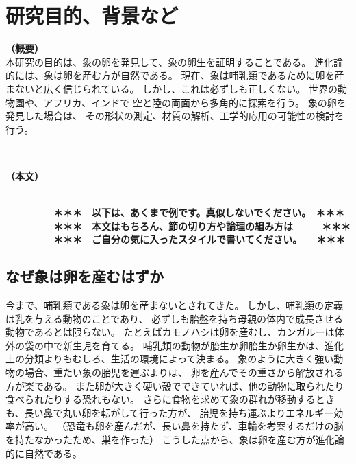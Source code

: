 \documentclass[11pt,a4j,dvipdfmx]{jarticle} 					%
\newcommand{\研究課題名}{象の卵}
\newcommand{\研究機関名}{逢坂大学}
\newcommand{\研究代表者氏名}{湯川秀樹}
\newcommand{\研究期間の最終元号年度}{8}  %
\begin{document}

\section{研究目的、背景など}

\noindent
\mbox{\textbf{（概要）}}\\
本研究の目的は、象の卵を発見して、象の卵生を証明することである。
進化論的には、象は卵を産む方が自然である。
	現在、象は哺乳類であるために卵を産まないと広く信じられている。
	しかし、これは必ずしも正しくない。
	世界の動物園や、アフリカ、インドで
	空と陸の両面から多角的に探索を行う。
	象の卵を発見した場合は、
	その形状の測定、材質の解析、工学的応用の可能性の検討を行う。

\noindent
\rule{\linewidth}{1pt}\\
\noindent
\mbox{\textbf{（本文）}}
\JSPSInstructions	%

\textbf{\\　　　　　＊＊＊　以下は、あくまで例です。真似しないでください。　＊＊＊\\
　　　　　＊＊＊　本文はもちろん、節の切り方や論理の組み方は　　　＊＊＊\\
　　　　　＊＊＊　ご自分の気に入ったスタイルで書いてください。　　＊＊＊}

\subsection{なぜ象は卵を産むはずか}
今まで、哺乳類である象は卵を産まないとされてきた。
しかし、哺乳類の定義は乳を与える動物のことであり、
必ずしも胎盤を持ち母親の体内で成長させる動物であるとは限らない。
たとえばカモノハシは卵を産むし、カンガルーは体外の袋の中で新生児を育てる。
哺乳類の動物が胎生か卵胎生か卵生かは、進化上の分類よりもむしろ、生活の環境によって決まる。
象のように大きく強い動物の場合、重たい象の胎児を運ぶよりは、
卵を産んでその重さから解放される方が楽である。
また卵が大きく硬い殻でできていれば、他の動物に取られたり食べられたりする恐れもない。
さらに食物を求めて象の群れが移動するときも、長い鼻で丸い卵を転がして行った方が、
胎児を持ち運ぶよりエネルギー効率が高い。
（恐竜も卵を産んだが、長い鼻を持たず、車輪を考案するだけの脳を持たなかったため、巣を作った）
こうした点から、象は卵を産む方が進化論的に自然である。
\end{document}
